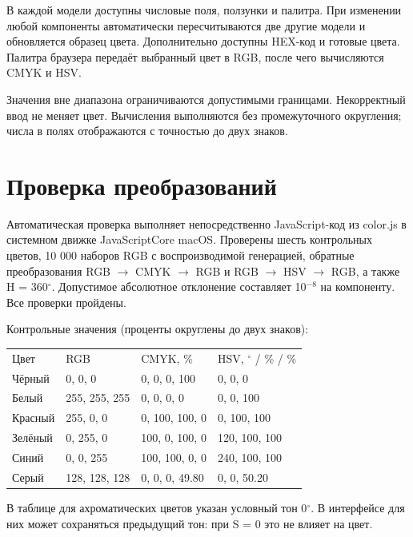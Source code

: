 \documentclass[12pt,a4paper]{article}
\begin{document}
В каждой модели доступны числовые поля, ползунки и палитра. При изменении любой компоненты автоматически пересчитываются две другие модели и обновляется образец цвета. Дополнительно доступны HEX-код и готовые цвета. Палитра браузера передаёт выбранный цвет в RGB, после чего вычисляются CMYK и HSV.

Значения вне диапазона ограничиваются допустимыми границами. Некорректный ввод не меняет цвет. Вычисления выполняются без промежуточного округления; числа в полях отображаются с точностью до двух знаков.
\section{Проверка преобразований}
Автоматическая проверка выполняет непосредственно JavaScript-код из color.js в системном движке JavaScriptCore macOS. Проверены шесть контрольных цветов, 10 000 наборов RGB с воспроизводимой генерацией, обратные преобразования RGB $\to$ CMYK $\to$ RGB и RGB $\to$ HSV $\to$ RGB, а также H = 360$^\circ$. Допустимое абсолютное отклонение составляет 10$^{-8}$ на компоненту. Все проверки пройдены.

Контрольные значения (проценты округлены до двух знаков):

\begin{center}\small\begin{tabular}{llll}\toprule
Цвет & RGB & CMYK, \% & HSV, $^\circ$ / \% / \% \\
Чёрный & 0, 0, 0 & 0, 0, 0, 100 & 0, 0, 0 \\
Белый & 255, 255, 255 & 0, 0, 0, 0 & 0, 0, 100 \\
Красный & 255, 0, 0 & 0, 100, 100, 0 & 0, 100, 100 \\
Зелёный & 0, 255, 0 & 100, 0, 100, 0 & 120, 100, 100 \\
Синий & 0, 0, 255 & 100, 100, 0, 0 & 240, 100, 100 \\
Серый & 128, 128, 128 & 0, 0, 0, 49.80 & 0, 0, 50.20 \\
\bottomrule\end{tabular}\end{center}

В таблице для ахроматических цветов указан условный тон 0$^\circ$. В интерфейсе для них может сохраняться предыдущий тон: при S = 0 это не влияет на цвет.
\end{document}
